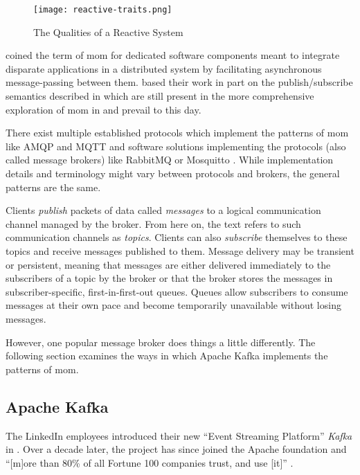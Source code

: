 \begin{figure}
  \centering
  \texttt{[image: reactive-traits.png]}
  \caption{The Qualities of a Reactive System \parencite{boner_reactive_2014}}
  \label{fig:reactive-traits}
\end{figure}

\cite{banavar_case_1999} coined the term of \acrlong{mom} for dedicated software components meant to integrate disparate applications in a distributed system by facilitating asynchronous message-passing between them.
\citeauthor{banavar_case_1999} based their work in part on the publish/subscribe semantics described in \cite{oki_information_1993} which are still present in the more comprehensive exploration of \gls{mom} in \cite{curry_message-oriented_2004} and prevail to this day.

There exist multiple established protocols which implement the patterns of \gls{mom} like AMQP and MQTT \parencites{amqp}{mqtt} and software solutions implementing the protocols (also called message brokers) like RabbitMQ or Mosquitto \parencites{rabbitmq}{mosquitto}.
While implementation details and terminology might vary between protocols and brokers, the general patterns are the same.

Clients \emph{publish} packets of data called \emph{messages} to a logical communication channel managed by the broker.
From here on, the text refers to such communication channels as \emph{topics}.
Clients can also \emph{subscribe} themselves to these topics and receive messages published to them.
Message delivery may be transient or persistent, meaning that messages are either delivered immediately to the subscribers of a topic by the broker or that the broker stores the messages in subscriber-specific, first-in-first-out queues.
Queues allow subscribers to consume messages at their own pace and become temporarily unavailable without losing messages.
\parencite{curry_message-oriented_2004}

However, one popular message broker does things a little differently.
The following section examines the ways in which Apache Kafka implements the patterns of \gls{mom}.

\subsection{Apache Kafka}

The LinkedIn employees \citeauthor{kreps_kafka_2011} introduced their new \enquote{Event Streaming Platform} \emph{Kafka} in \citeyear{kreps_kafka_2011} \parencite{kreps_kafka_2011}.
Over a decade later, the project has since joined the Apache foundation and \enquote{[m]ore than 80\% of all Fortune 100 companies trust, and use [it]} \parencite{apache_software_foundation_apache_nodate}.

